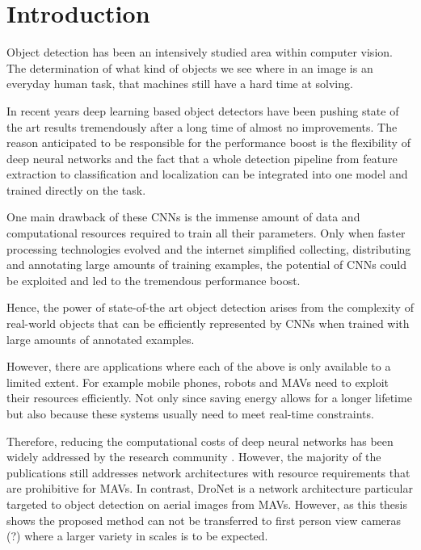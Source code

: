 \chapter{Introduction}
\label{sec:intro}

Object detection has been an intensively studied area within computer vision. The determination of what kind of objects we see where in an image is an everyday human task, that machines still have a hard time at solving.


In recent years deep learning based object detectors have been pushing state of the art results tremendously after a long time of almost no improvements. The reason anticipated to be responsible for the performance boost is the flexibility of deep neural networks and the fact that a whole detection pipeline from feature extraction to classification and localization can be integrated into one model and trained directly on the task.

One main drawback of these \acp{CNN} is the immense amount of data and computational resources required to train all their parameters. Only when faster processing technologies evolved and the internet simplified collecting, distributing and annotating large amounts of training examples, the potential of \acp{CNN} could be exploited  and led to the tremendous performance boost. 

Hence, the power of state-of-the art object detection arises from the complexity of real-world objects that can be efficiently represented by \acp{CNN} when trained with large amounts of annotated examples.

However, there are applications where each of the above is only available to a limited extent. For example mobile phones, robots and \acp{MAV} need to exploit their resources efficiently. Not only since saving energy allows for a longer lifetime but also because these systems usually need to meet real-time constraints.

Therefore, reducing the computational costs of deep neural networks has been widely addressed by the research community . However, the majority of the publications still addresses network architectures with resource requirements that are prohibitive for \acp{MAV}. In contrast, DroNet \cite{Kyrkou2018} is a network architecture particular targeted to object detection on aerial images from \acp{MAV}. However, as this thesis shows the proposed method can not be transferred to first person view cameras (?) where a larger variety in scales is to be expected.

